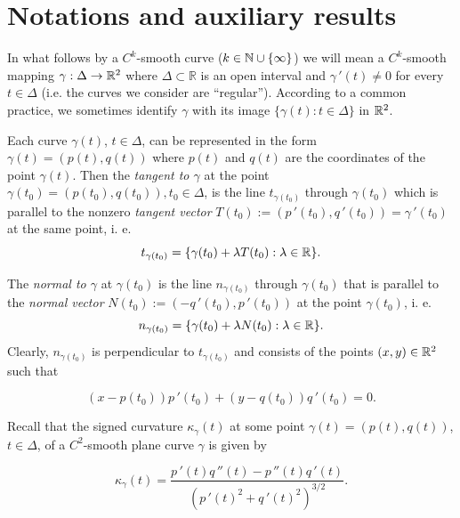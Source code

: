 \documentclass[a4paper,12pt]{amsart}
\def\g{\gamma}
\begin{document}
\section{Notations and auxiliary results}\label{au}

In what follows by a $C^k$-smooth curve ($k\in\Bbb N \cup
\{{\infty}\}$) we will mean a $C^k$-smooth mapping
$\g:\Delta\to\Bbb R^2$
where $\Delta \subset
\mathbb{R}$ is an open interval and $\g\,'(t) \neq 0$ for every $t \in \Delta$
(i.e. the curves we consider are ``regular'').
According to a common practice, we sometimes identify $\g$ with its image $\{\g(t): t \in \Delta \}$ in $\Bbb R^2$.

Each curve $\g(t)$, $t \in \Delta$, can be represented in the form
$\g(t)=(p(t),q(t))$ where $p(t)$ and $q(t)$ are the coordinates of the point $\g(t)$. Then the {\it tangent to $\g$} at the point $\g(t_0)=(p(t_0), q(t_0)), t_0 \in \Delta$, is the line $t_{\g(t_0)}$ through
$\g(t_0)$ which is parallel to the nonzero {\it  tangent vector}
$T(t_0) := (p\,'(t_0), q\,'(t_0))= \g\,'(t_0)$ at the same point,  i. e.
$$t_{\g(t_0)}=\{\g(t_0) + \lambda T(t_0) : \lambda \in \Bbb R\}.$$

The {\it normal to $\g$} at $\g(t_0)$  is the line
$n_{\g(t_0)}$ through  $\g(t_0)$ that is parallel to the {\it normal vector} $N(t_0):=(- q\,'(t_0), p\,'(t_0))$ at  the point $\g(t_0)$, i. e.
$$n_{\g(t_0)}=\{\g(t_0) + \lambda N(t_0) : \lambda \in \Bbb R\}.$$
Clearly, $n_{\g(t_0)}$ is perpendicular to $t_{\g(t_0)}$ and  consists of the points $(x,y) \in \Bbb R^2$ such that

\begin{equation}\label{normala}
(x - p(t_0))p\,'(t_0) + (y - q(t_0))q\,'(t_0) = 0.
\end{equation}

Recall that the signed curvature $\kappa_{\g}(t)$ at some point $\g(t)=(p(t),q(t))$, $t \in \Delta$, of a $C^2$-smooth
plane curve  $\g$  is given by

\begin{equation}\label{1}
\kappa_{\g}(t)=\frac{p\,'(t)q\,''(t)-p\,''(t)q\,'(t)}{(p\,'(t)^2+q\,'(t)^2)^{3/2}} .
\end{equation}

\end{document}
